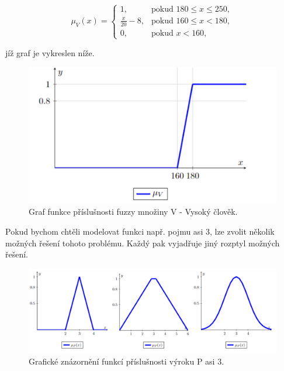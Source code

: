     $$\mu_V(x)=\begin{cases} 1, & \mbox{pokud }  180\leq x \leq 250,\\ 
    \frac{x}{20} - 8, & \mbox{pokud } 160 \leq x < 180,\\
    0, & \mbox{pokud } x < 160,  \end{cases}$$

    jíž graf je vykreslen níže.

\begin{figure}[h]
    \caption{ Graf funkce příslušnosti fuzzy množiny V - \clqq Vysoký člověk\crqq.}
        \includegraphics[scale=0.65]{template-fig/vysoky_clovek.pdf}
        \centering
\end{figure}    



Pokud bychom chtěli modelovat funkci např. pojmu \clqq asi 3\crqq, lze zvolit několik možných řešení tohoto problému. Každý pak vyjadřuje jiný rozptyl možných řešení.
 
    \begin{figure}[h]
    \caption{Grafické znázornění funkcí příslušnosti výroku P \clqq asi 3\crqq.\\}
        \includegraphics[scale=0.65]{template-fig/asi_3.pdf}
        \centering
    \end{figure}




